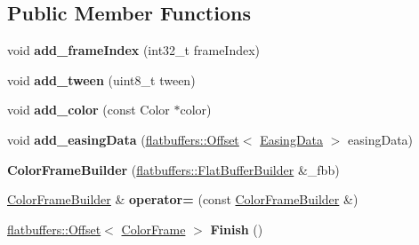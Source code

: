 \subsection*{Public Member Functions}
\begin{DoxyCompactItemize}
\item 
\mbox{\label{structflatbuffers_1_1ColorFrameBuilder_ae643c91dd34e4b64c85ef66de8e33a16}} 
void {\bfseries add\+\_\+frame\+Index} (int32\+\_\+t frame\+Index)
\item 
\mbox{\label{structflatbuffers_1_1ColorFrameBuilder_a0dbeb657cbf199a4ce151bc54f8060ea}} 
void {\bfseries add\+\_\+tween} (uint8\+\_\+t tween)
\item 
\mbox{\label{structflatbuffers_1_1ColorFrameBuilder_ac8dfdc91477bd4494d5e560b8e27aa57}} 
void {\bfseries add\+\_\+color} (const Color $\ast$color)
\item 
\mbox{\label{structflatbuffers_1_1ColorFrameBuilder_a7bd0cd0a6ac36772ad4ebebce39cf50e}} 
void {\bfseries add\+\_\+easing\+Data} (\hyperlink{structflatbuffers_1_1Offset}{flatbuffers\+::\+Offset}$<$ \hyperlink{structflatbuffers_1_1EasingData}{Easing\+Data} $>$ easing\+Data)
\item 
\mbox{\label{structflatbuffers_1_1ColorFrameBuilder_a582544dd1db8701b7c53b2561e46c9bc}} 
{\bfseries Color\+Frame\+Builder} (\hyperlink{classflatbuffers_1_1FlatBufferBuilder}{flatbuffers\+::\+Flat\+Buffer\+Builder} \&\+\_\+fbb)
\item 
\mbox{\label{structflatbuffers_1_1ColorFrameBuilder_a20e65ea1c34348157fe4f8037efdd222}} 
\hyperlink{structflatbuffers_1_1ColorFrameBuilder}{Color\+Frame\+Builder} \& {\bfseries operator=} (const \hyperlink{structflatbuffers_1_1ColorFrameBuilder}{Color\+Frame\+Builder} \&)
\item 
\mbox{\label{structflatbuffers_1_1ColorFrameBuilder_a4faf164012313823c3d9f696cbc886c3}} 
\hyperlink{structflatbuffers_1_1Offset}{flatbuffers\+::\+Offset}$<$ \hyperlink{structflatbuffers_1_1ColorFrame}{Color\+Frame} $>$ {\bfseries Finish} ()

\end{DoxyCompactItemize}
